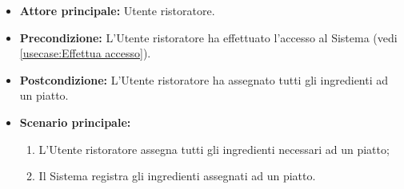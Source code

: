 \label{usecase:Assegnamento ingredienti ad un piatto}
\begin{itemize}
	\item \textbf{Attore principale:} Utente ristoratore.

	\item \textbf{Precondizione:} L'Utente ristoratore ha effettuato l'accesso al Sistema (vedi \autoref{usecase:Effettua accesso}).


	\item \textbf{Postcondizione:}
	      L'Utente ristoratore ha assegnato tutti gli ingredienti ad un piatto.

	\item \textbf{Scenario principale:}
	      \begin{enumerate}
		      \item L'Utente ristoratore assegna tutti gli ingredienti necessari ad un piatto;

		      \item Il Sistema registra gli ingredienti assegnati ad un piatto.
        \end{enumerate}
\end{itemize}
